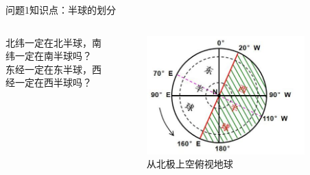 \documentclass[10pt]{ctexbeamer}
\begin{document}
    \begin{frame}{问题1}{知识点：半球的划分}
        \begin{columns}
            \begin{block}{}
                北纬一定在北半球，南纬一定在南半球吗？\\
                东经一定在东半球，西经一定在西半球吗？
            \end{block}
            \begin{figure}
                \includegraphics[width=0.89\textwidth]{assets/line 2.jpg}
                \caption{从北极上空俯视地球}
            \end{figure}
            
        \end{columns}
    \end{frame}
\end{document}
